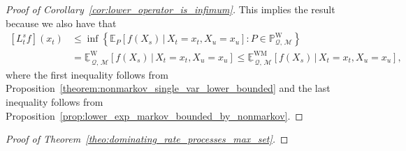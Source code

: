 \documentclass[10pt,a4paper]{paper}
\theoremstyle{definition}
\newcommand{\reals}{\mathbb{R}}
\newcommand{\realsnonneg}{\reals_{\geq 0}}
\newcommand{\states}{\mathcal{X}}
\newcommand{\processes}{\mathbb{P}}
\newcommand{\wprocesses}{\processes^{\mathrm{W}}}
\newcommand{\gambles}{\mathcal{L}}
\newcommand{\gamblesX}{\gambles(\states)}
\newcommand{\rateset}{\mathcal{Q}}
\newcommand{\lrate}{\underline{Q}}
\begin{document}
\begin{proof}[Proof of Corollary~\ref{cor:lower_operator_is_infimum}]
This implies the result because we also have that
\begin{align*}
\left[L_t^sf\right](x_t)
&\leq\inf\left\{\mathbb{E}_P[f(X_s)\,\vert\,X_t=x_t,X_u=x_u]\colon P\in\wprocesses_{\rateset,\,\mathcal{M}}\right\}\\
&=\underline{\mathbb{E}}^{\mathrm{W}}_{\,\rateset,\,\mathcal{M}}[f(X_s)\,\vert\,X_t=x_t,X_u=x_u] 
\leq
\underline{\mathbb{E}}^{\mathrm{WM}}_{\,\rateset,\,\mathcal{M}}[f(X_s)\,\vert\,X_t=x_t,X_u=x_u],
\end{align*}
where the first inequality follows from Proposition~\ref{theorem:nonmarkov_single_var_lower_bounded} and the last inequality follows from Proposition~\ref{prop:lower_exp_markov_bounded_by_nonmarkov}.
\end{proof}

\begin{proof}[Proof of Theorem~\ref{theo:dominating_rate_processes_max_set}]





\end{proof}
\end{document}
